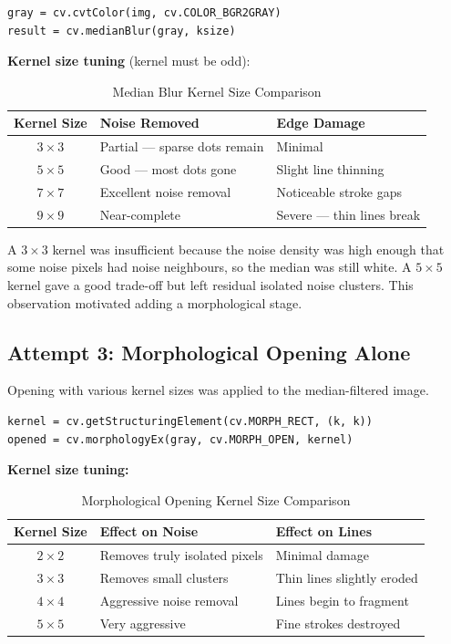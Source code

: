 \documentclass[journal]{IEEEtran}
\begin{document}
\begin{lstlisting}
gray = cv.cvtColor(img, cv.COLOR_BGR2GRAY)
result = cv.medianBlur(gray, ksize)
\end{lstlisting}

\textbf{Kernel size tuning} (kernel must be odd):

\begin{table}[h]
\centering
\caption{Median Blur Kernel Size Comparison}
\begin{tabular}{@{}cll@{}}
\toprule
Kernel Size & Noise Removed & Edge Damage \\
\midrule
$3\times3$ & Partial — sparse dots remain & Minimal \\
$5\times5$ & Good — most dots gone & Slight line thinning \\
$7\times7$ & Excellent noise removal & Noticeable stroke gaps \\
$9\times9$ & Near-complete & Severe — thin lines break \\
\bottomrule
\end{tabular}
\end{table}

A $3\times3$ kernel was insufficient because the noise density was high enough that 
some noise pixels had noise neighbours, so the median was still white. A $5\times5$ 
kernel gave a good trade-off but left residual isolated noise clusters. This observation 
motivated adding a morphological stage.

\subsection{Attempt 3: Morphological Opening Alone}
Opening with various kernel sizes was applied to the median-filtered image.

\begin{lstlisting}
kernel = cv.getStructuringElement(cv.MORPH_RECT, (k, k))
opened = cv.morphologyEx(gray, cv.MORPH_OPEN, kernel)
\end{lstlisting}

\textbf{Kernel size tuning:}

\begin{table}[h]
\centering
\caption{Morphological Opening Kernel Size Comparison}
\begin{tabular}{@{}cll@{}}
\toprule
Kernel Size & Effect on Noise & Effect on Lines \\
\midrule
$2\times2$ & Removes truly isolated pixels & Minimal damage \\
$3\times3$ & Removes small clusters & Thin lines slightly eroded \\
$4\times4$ & Aggressive noise removal & Lines begin to fragment \\
$5\times5$ & Very aggressive & Fine strokes destroyed \\
\bottomrule
\end{tabular}
\end{table}
\end{document}
